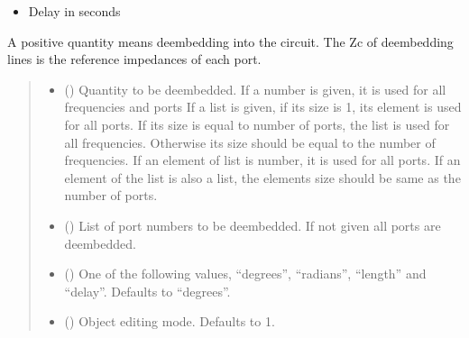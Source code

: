 \documentclass[letterpaper,10pt,english]{sphinxmanual}
\begin{document}
\begin{fulllineitems}
\begin{fulllineitems}
\begin{description}
\begin{itemize}
\item {} 
\sphinxAtStartPar
Delay in seconds

\end{itemize}

\end{description}

\sphinxAtStartPar
A positive quantity means deembedding into the circuit.
The Zc of de\sphinxhyphen{}embedding lines is the reference impedances of each port.
\begin{quote}\begin{description}
\begin{itemize}
\item {} 
\sphinxAtStartPar
{} () \textendash{} Quantity to be deembedded.
\sphinxhyphen{} If a number is given, it is used for all frequencies and ports
\sphinxhyphen{} If a list is given, if its size is 1, its element is used for all ports. If its size is equal to number of ports, the list is used for all frequencies.
Otherwise its size should be equal to the number of frequencies. If an element of list is number, it is used for all ports. If an element of the list is also a list, the elements size should be same as the number of ports.

\item {} 
\sphinxAtStartPar
{} (\sphinxstyleliteralemphasis{\sphinxupquote{, }}) \textendash{} List of port numbers to be deembedded. If not given all ports are deembedded.

\item {} 
\sphinxAtStartPar
{} (\sphinxstyleliteralemphasis{\sphinxupquote{, }}) \textendash{} One of the following values, “degrees”, “radians”, “length” and “delay”. Defaults to “degrees”.

\item {} 
\sphinxAtStartPar
{} (\sphinxstyleliteralemphasis{\sphinxupquote{, }}) \textendash{} Object editing mode. Defaults to \sphinxhyphen{}1.


\end{itemize}
\end{description}
\end{quote}
\end{fulllineitems}
\end{fulllineitems}
\end{document}
